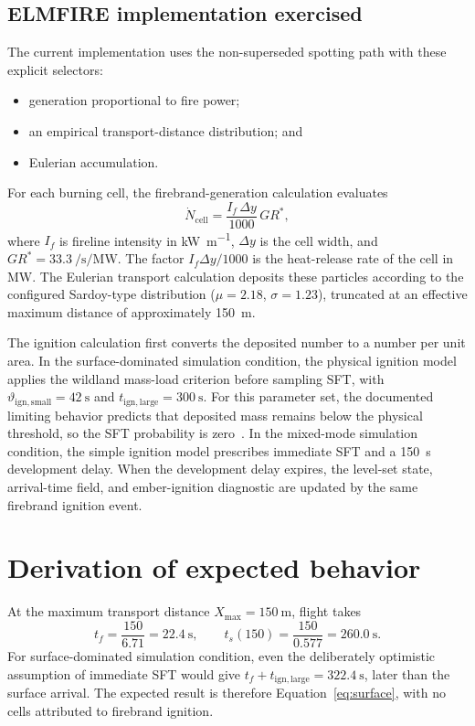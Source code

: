 \subsection{ELMFIRE implementation exercised}

The current implementation uses the non-superseded spotting path with these
explicit selectors:
\begin{itemize}
\item generation proportional to fire power;
\item an empirical transport-distance distribution; and
\item Eulerian accumulation.
\end{itemize}
For each burning cell, the firebrand-generation calculation evaluates
\begin{equation}
 \dot N_{\mathrm{cell}}
 = \frac{I_f\,\Delta y}{1000}\,GR^* ,
 \label{eq:generation}
\end{equation}
where $I_f$ is fireline intensity in \si{\kilo\watt\per\metre},
$\Delta y$ is the cell width, and
$GR^*=\SI{33.3}{\per\second\per\mega\watt}$. The factor
$I_f\Delta y/1000$ is the heat-release rate of the cell in MW. The Eulerian
transport calculation deposits these particles according to the configured
Sardoy-type distribution ($\mu=2.18$, $\sigma=1.23$), truncated at an
effective maximum distance of approximately \SI{150}{\metre}.

The ignition calculation first converts the deposited number to a number per unit
area. In the surface-dominated simulation condition, the physical ignition model
applies the
wildland mass-load criterion before sampling SFT, with
$\vartheta_{\mathrm{ign,small}}=\SI{42}{\second}$ and
$t_{\mathrm{ign,large}}=\SI{300}{\second}$. For this parameter set, the
documented limiting behavior predicts that deposited mass remains below the
physical threshold, so the SFT probability is zero~\cite{Qin2025}. In the
mixed-mode simulation condition, the simple ignition model
prescribes immediate
SFT and a \SI{150}{\second} development delay. When the development delay
expires, the level-set state, arrival-time field, and ember-ignition diagnostic
are updated by the same firebrand ignition event.

\section{Derivation of expected behavior}

At the maximum transport distance $X_{\max}=\SI{150}{\metre}$, flight takes
\[
 t_f=\frac{150}{6.71}=\SI{22.4}{\second},
 \qquad
 t_s(150)=\frac{150}{0.577}=\SI{260.0}{\second}.
\]
For surface-dominated simulation condition, even the deliberately optimistic assumption of immediate SFT
would give $t_f+t_{\mathrm{ign,large}}=\SI{322.4}{\second}$, later than the
surface arrival. The expected result is therefore Equation~\ref{eq:surface},
with no cells attributed to firebrand ignition.

